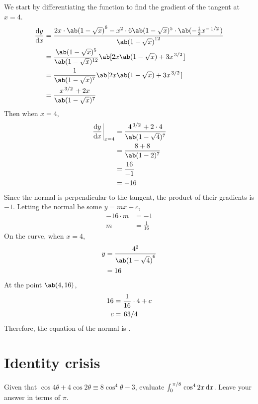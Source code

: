 We start by differentiating the function to find the gradient of the tangent at \(x = 4\).
\begin{align*}
	\odv{y}{x} & = \frac{2x \cdot {\ab(1-\sqrt{x})}^6 - x^2 \cdot 6\ab(1-\sqrt{x})^5 \cdot \ab(-\frac{1}{2} x^{-\cf{1}{2}})}{{\ab(1 - \sqrt{x})}^{12}} \\
	           & = \frac{\ab(1-\sqrt{x})^5}{\ab(1-\sqrt{x})^{12}} \ab[2x\ab(1-\sqrt{x}) + 3x^{\cf{3}{2}}]                                              \\
	           & = \frac{1}{\ab(1-\sqrt{x})^7} \ab[2x\ab(1-\sqrt{x}) + 3x^{\cf{3}{2}}]                                                                 \\
	           & = \frac{x^{\cf{3}{2}} + 2x}{\ab(1-\sqrt{x})^7}
\end{align*}
Then when \(x = 4\),
\begin{align*}
	\odv[delims-eval=.|]{y}{x}_{x = 4} & = \frac{4^{\cf{3}{2}} + 2 \cdot 4}{\ab(1-\sqrt{4})^7} \\
	                                   & = \frac{8 + 8}{\ab(1-2)^7}                            \\
	                                   & = \frac{16}{-1}                                       \\
	                                   & = -16
\end{align*}
Since the normal is perpendicular to the tangent, the product of their gradients is \(-1\).
Letting the normal be some \(y = mx + c\),
\begin{align*}
	-16 \cdot m & = -1           \\
	m           & = \frac{1}{16}
\end{align*}
On the curve, when \(x = 4\),
\begin{align*}
	y & = \frac{4^2}{{\ab(1 - \sqrt{4})}^6} \\
	  & = 16
\end{align*}
At the point \(\ab(4, 16)\),
\begin{align*}
	16 & = \frac{1}{16} \cdot 4 + c \\
	c  & = \cf{63}{4}
\end{align*}
Therefore, the equation of the normal is .

\section{Identity crisis}
Given that \(\cos 4\theta + 4 \cos 2\theta \equiv 8 \cos^4 \theta - 3\), evaluate
\(\int_{0}^{\cf{\pi}{8}} \cos^4 2x \odif{x}\). Leave your answer in terms of \(\pi\).

